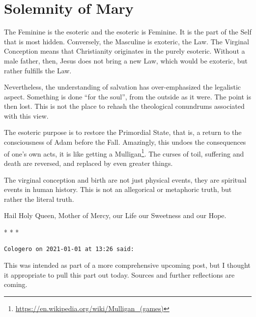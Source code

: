 \section{Solemnity of Mary}

The Feminine is the esoteric and the esoteric is Feminine. It is the part of the Self that is most hidden. Conversely, the Masculine is exoteric, the Law. The Virginal Conception means that Christianity originates in the purely esoteric. Without a male father, then, Jesus does not bring a new Law, which would be exoteric, but rather fulfills the Law.


Nevertheless, the understanding of salvation has over-emphasized the legalistic aspect. Something is done ``for the soul'', from the outside as it were. The point is then lost. This is not the place to rehash the theological conundrums associated with this view.

The esoteric purpose is to restore the Primordial State, that is, a return to the consciousness of Adam before the Fall. Amazingly, this undoes the consequences of one's own acts, it is like getting a Mulligan\footnote{\url{https://en.wikipedia.org/wiki/Mulligan\_(games)}}. The curses of toil, suffering and death are reversed, and replaced by even greater things.

The virginal conception and birth are not just physical events, they are spiritual events in human history. This is not an allegorical or metaphoric truth, but rather the literal truth.

Hail Holy Queen, Mother of Mercy, our Life our Sweetness and our Hope.



\begin{center}* * *\end{center}

\begin{footnotesize}
\begin{sffamily}
\texttt{Cologero on 2021-01-01 at 13:26 said:}

This was intended as part of a more comprehensive upcoming post, but I thought it appropriate to pull this part out today. Sources and further reflections are coming.

\end{sffamily}
\end{footnotesize}

